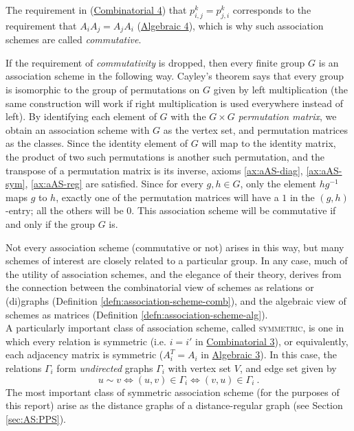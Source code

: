 \documentclass{report}
\begin{document}
    The requirement in (\hyperref[ax:cAS-reg]{Combinatorial 4}) that $p_{i, j}^k =
    p_{j, i}^k$ corresponds to the requirement that $A_i A_j = A_j A_i$
    (\hyperref[ax:aAS-reg]{Algebraic 4}), which is why such association schemes are
    called \textit{commutative}.

    If the requirement of \textit{commutativity} is dropped, then every finite
    group $G$ is an association scheme in the following way.  Cayley's theorem
    says that every group is isomorphic to the group of permutations on $G$
    given by left multiplication (the same construction will work if right
    multiplication is used everywhere instead of left).  By identifying each
    element of $G$ with the $G \times G$ \textit{permutation matrix}, we obtain
    an association scheme with $G$ as the vertex set, and permutation matrices
    as the classes.  Since the identity element of $G$ will map to the identity
    matrix, the product of two such permutations is another such permutation,
    and the transpose of a permutation matrix is its inverse, axioms
    \ref{ax:aAS-diag}, \ref{ax:aAS-sym}, \ref{ax:aAS-reg} are satisfied.  Since for
    every $g, h \in G$, only the element $hg^{-1}$ maps $g$ to $h$, exactly one
    of the permutation matrices will have a $1$ in the $(g, h)$-entry; all the
    others will be $0$.  This association scheme will be commutative if and only
    if the group $G$ is.

    Not every association scheme (commutative or not) arises in this way, but
    many schemes of interest are closely related to a particular group.
    In any case, much of the utility of association schemes, and the elegance
    of their theory, derives from the connection between the combinatorial view
    of schemes as relations or (di)graphs (Definition
    \ref{defn:association-scheme-comb}), and the algebraic view of schemes as
    matrices (Definition \ref{defn:association-scheme-alg}).
    \\

    A particularly important class of association scheme, called
    \textsc{symmetric}, is one in which every relation is symmetric (i.e. $i =
    i'$ in \hyperref[ax:cAS-sym]{Combinatorial 3}), or equivalently, each adjacency
    matrix is symmetric ($A_i^T = A_i$ in \hyperref[ax:aAS-sym]{Algebraic 3}).
    In this case, the relations $\Gamma_i$ form \textit{undirected} graphs $\Gamma_i$
    with vertex set $V$, and edge set given by
    $$
      u \sim v \iff (u, v) \in \Gamma_i \iff (v, u) \in \Gamma_i
      \ .
    $$
    The most important class of symmetric association scheme (for the purposes
    of this report) arise as the distance graphs of a distance-regular graph
    (see Section \ref{sec:AS:PPS}).
\end{document}

